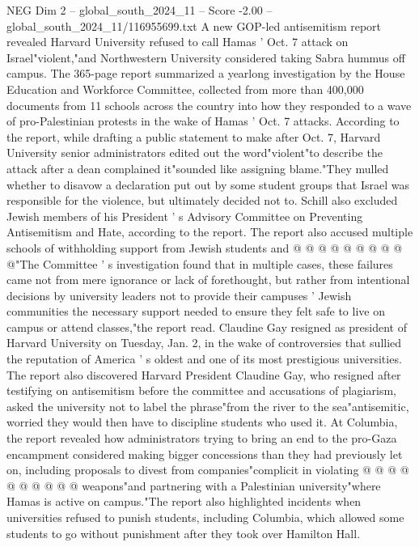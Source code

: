 \begin{textsample}{NEG Dim 2 – global\_south\_2024\_11 – Score -2.00 – global\_south\_2024\_11/116955699.txt}  \label{ex:f2_neg_199}
A new GOP-led antisemitism report revealed Harvard University refused to call Hamas ' Oct. 7 attack on Israel"violent,"and Northwestern University considered taking Sabra hummus off campus.
The 365-page report summarized a yearlong investigation by the House Education and Workforce Committee, collected from more than 400,000 documents from 11 schools across the country into how they responded to a wave of pro-Palestinian protests in the wake of Hamas ' Oct. 7 attacks.
According to the report, while drafting a public statement to make after Oct. 7, Harvard University senior administrators edited out the word"violent"to describe the attack after a dean complained it"sounded like assigning blame."They mulled whether to disavow a declaration put out by some student groups that Israel was responsible for the violence, but ultimately decided not to.
Schill also excluded Jewish members of his President ' s Advisory Committee on Preventing Antisemitism and Hate, according to the report.
The report also accused multiple schools of withholding support from Jewish students and @ @ @ @ @ @ @ @ @ @"The Committee ' s investigation found that in multiple cases, these failures came not from mere ignorance or lack of forethought, but rather from intentional decisions by university leaders not to provide their campuses ' Jewish communities the necessary support needed to ensure they felt safe to live on campus or attend classes,"the report read.
Claudine Gay resigned as president of Harvard University on Tuesday, Jan. 2, in the wake of controversies that sullied the reputation of America ' s oldest and one of its most prestigious universities.
The report also discovered Harvard President Claudine Gay, who resigned after testifying on antisemitism before the committee and accusations of plagiarism, asked the university not to label the phrase"from the river to the sea"antisemitic, worried they would then have to discipline students who used it.
At Columbia, the report revealed how administrators trying to bring an end to the pro-Gaza encampment considered making bigger concessions than they had previously let on, including proposals to divest from companies"complicit in violating @ @ @ @ @ @ @ @ @ @ weapons"and partnering with a Palestinian university"where Hamas is active on campus."The report also highlighted incidents when universities refused to punish students, including Columbia, which allowed some students to go without punishment after they took over Hamilton Hall.

\end{textsample}
